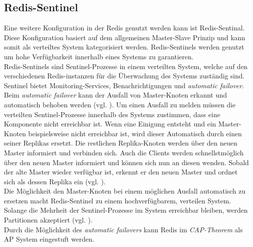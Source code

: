 \subsection{Redis-Sentinel}
Eine weitere Konfiguration in der \acs{Redis} genutzt werden kann ist Redis-Sentinal. Diese Konfiguration basiert auf dem allgemeinen Master-Slave Prinzip und kann somit als verteiltes System kategorisiert werden. Redis-Sentinels werden genutzt um hohe Verfügbarkeit innerhalb eines Systems zu garantieren. 
\\
Redis-Sentinels sind Sentinel-Prozesse in einem verteilten System, welche auf den verschiedenen Redis-instanzen für die Überwachung des Systems zuständig sind. 
\\
Sentinel bietet Monitoring-Services, Benachrichtigungen und \textit{automatic failover}. Beim \textit{automatic failover} kann der Ausfall von Master-Knoten erkannt und automatisch behoben werden (vgl. \cite{Redis-Sentinal}).
Um einen Ausfall zu melden müssen die verteilten Sentinel-Prozesse innerhalb des Systems zustimmen, dass eine Komponente nicht erreichbar ist. Wenn eine Einigung entsteht und ein Master-Knoten beispielsweise nicht erreichbar ist, wird dieser Automatisch durch einen seiner Replikas ersetzt.  Die restlichen Replika-Knoten werden über den neuen Master informiert und verbinden sich. Auch die Clients werden schnellstmöglich über den neuen Master informiert und können sich nun an diesen wenden. Sobald der alte Master wieder verfügbar ist, erkennt er den neuen Master und ordnet sich als dessen Replika ein (vgl. \cite{Redis-Sentinal}).
\\
Die Möglichkeit den Master-Knoten bei einem möglichen Ausfall automatisch zu ersetzen macht Redis-Sentinel zu einem hochverfügbarem, verteilen System.
\\
Solange die Mehrheit der Sentinel-Prozesse im System erreichbar bleiben, werden Partitionen akzeptiert (vgl. \cite{Redis-Sentinal}).
\\
Durch die Möglichkeit des \textit{automatic failovers} kann Redis im \textit{CAP-Theorem} als AP System eingestuft werden.